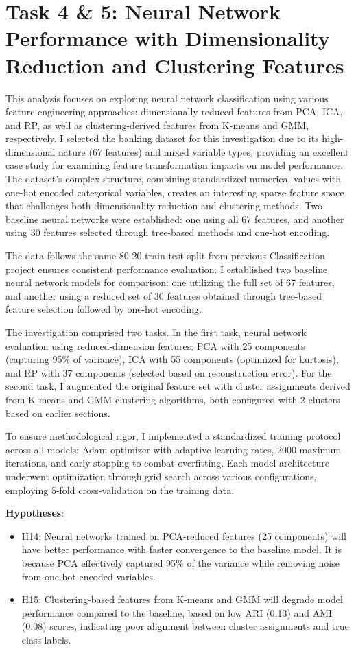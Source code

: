 \documentclass[conference]{IEEEtran}
\begin{document}
\section{Task 4 \& 5: Neural Network Performance with Dimensionality Reduction and Clustering Features}
This analysis focuses on exploring neural network classification using various feature engineering approaches: dimensionally reduced features from PCA, ICA, and RP, as well as clustering-derived features from K-means and GMM, respectively. I selected the banking dataset for this investigation due to its high-dimensional nature (67 features) and mixed variable types, providing an excellent case study for examining feature transformation impacts on model performance.
The dataset's complex structure, combining standardized numerical values with one-hot encoded categorical variables, creates an interesting sparse feature space that challenges both dimensionality reduction and clustering methods.  Two baseline neural networks were established: one using all 67 features, and another using 30 features selected through tree-based methods and one-hot encoding.

The data follows the same 80-20 train-test split from previous Classification project ensures consistent performance evaluation. I established two baseline neural network models for comparison: one utilizing the full set of 67 features, and another using a reduced set of 30 features obtained through tree-based feature selection followed by one-hot encoding.

The investigation comprised two tasks. In the first task, neural network evaluation using reduced-dimension features: PCA with 25 components (capturing 95\% of variance), ICA with 55 components (optimized for kurtosis), and RP with 37 components (selected based on reconstruction error). For the second task, I augmented the original feature set with cluster assignments derived from K-means and GMM clustering algorithms, both configured with 2 clusters based on earlier sections.

To ensure methodological rigor, I implemented a standardized training protocol across all models: Adam optimizer with adaptive learning rates, 2000 maximum iterations, and early stopping to combat overfitting. Each model architecture underwent optimization through grid search across various configurations, employing 5-fold cross-validation on the training data.

\textbf{Hypotheses}:
\begin{itemize}
    \item H14: Neural networks trained on PCA-reduced features (25 components) will have better performance with faster convergence to the baseline model. It is because PCA effectively captured 95\% of the variance while removing noise from one-hot encoded variables.
    \item H15: Clustering-based features from K-means and GMM will degrade model performance compared to the baseline, based on low ARI (0.13) and AMI (0.08) scores, indicating poor alignment between cluster assignments and true class labels.
\end{itemize}
\end{document}
